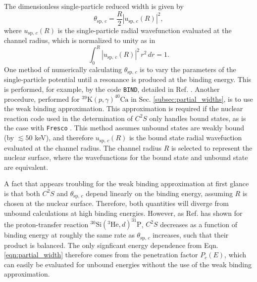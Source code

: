 The dimensionless single-particle reduced width is given by
\begin{equation} \label{eqn:single_particle_red_width}
\theta_{\mathrm{sp}, \, c} = \frac{R}{2} | u_{\mathrm{sp}, \, c}(R) |^{2},
\end{equation}
where $u_{\mathrm{sp}, \, c}(R)$ is the single-particle radial wavefunction evaluated at the channel radius, which is normalized to unity as in
\begin{equation}
\int_{0}^{R} |u_{\mathrm{sp}, \, c}(R)|^{2} \, r^{2} \, dr = 1.
\end{equation}
One method of numerically calculating $\theta_{\mathrm{sp}, \, c}$ is to vary the parameters of the single-particle potential until a resonance is produced at the binding energy. This is performed, for example, by the code \texttt{BIND}, detailed in Ref. \cite{Iliadis1997}. Another procedure, performed for $^{39}\mathrm{K}(p, \gamma)^{40}\mathrm{Ca}$ in Sec. \ref{subsec:partial_widths}, is to use the weak binding approximation. This approximation is required if the nuclear reaction code used in the determination of $C^{2}S$ only handles bound states, as is the case with \texttt{Fresco} \cite{Thompson1988,Fresco}. This method assumes unbound states are weakly bound (by $\lesssim 50$ keV), and therefore $u_{\mathrm{sp}, \, c}(R)$ is the bound state radial wavefuction evaluated at the channel radius. The channel radius $R$ is selected to represent the nuclear surface, where the wavefunctions for the bound state and unbound state are equivalent.

A fact that appears troubling for the weak binding approximation at first glance is that both $C^{2}S$ and $\theta_{\mathrm{sp}, \, c}$ depend linearly on the binding energy, assuming $R$ is chosen at the nuclear surface. Therefore, both quantities will diverge from unbound calculations at high binding energies. However, as Ref. \cite{Harrouz2023} has shown for the proton-transfer reaction $^{30}\mathrm{Si}(^{3}\mathrm{He},d)^{31}\mathrm{P}$, $C^{2}S$ decreases as a function of binding energy at roughly the same rate as $\theta_{\mathrm{sp}, \, c}$ increases, such that their product is balanced. The only signficant energy dependence from Eqn. \ref{eqn:partial_width} therefore comes from the penetration factor $P_{c}(E)$, which can easily be evaluated for unbound energies without the use of the weak binding approximation.

